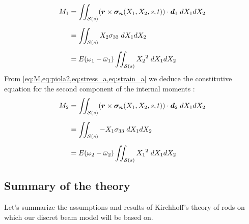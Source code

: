 \begin{equation}
	\begin{aligned}
		M_1 &= \iint_{\mathcal{S}(s)} (\vect{r} \times \vect{\sigma_n}(X_1, X_2, s, t)) \cdot \vect{d}_1 \;dX_1 dX_2
		\\[0.5em]
		&= \iint_{\mathcal{S}(s)} X_2\sigma_{33} \;dX_1 dX_2 
		\\[0.5em]
		&= E (\omega_1 - \overbar{\omega}_1) \iint_{\mathcal{S}(s)} {X_2}^2  \;dX_1 dX_2 
	\end{aligned}
\end{equation}
From \cref{eq:M,eq:piola2,eq:stress_a,eq:strain_a} we deduce the constitutive equation for the second component of the internal moments : 
\begin{equation}
	\begin{aligned}
		M_2 &= \iint_{\mathcal{S}(s)} (\vect{r} \times \vect{\sigma_n}(X_1, X_2, s, t)) \cdot \vect{d}_2 \;dX_1 dX_2
		\\[0.5em]
		&= \iint_{\mathcal{S}(s)} - X_1\sigma_{33} \;dX_1 dX_2 
		\\[0.5em]
		&= E (\omega_2 - \overbar{\omega}_2) \iint_{\mathcal{S}(s)} {X_1}^2  \;dX_1 dX_2 
	\end{aligned}
\end{equation}

\clearpage
\subsection{Summary of the theory}
Let's summarize the assumptions and results of Kirchhoff's theory of rods on which our discret beam model will be based on.

